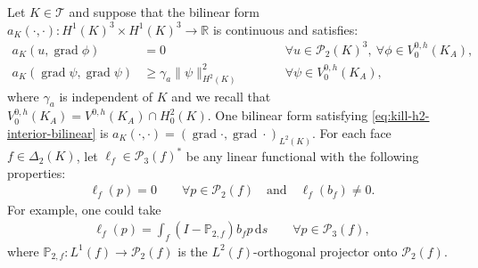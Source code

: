 \documentclass{mcom-l}
\theoremstyle{definition}
\theoremstyle{remark}
\numberwithin{equation}{section}
\renewcommand{\d}[1]{\,\mathrm{d}{#1}}
\DeclareMathOperator{\grad}{grad}
\newcommand{\mesh}[0]{\mathcal{T}}
\begin{document}
Let $K \in \mesh$ and suppose that the bilinear form
${a_K(\cdot,\cdot) : H^1(K)^3 \times H^1(K)^3 \to \mathbb{R}}$ 
is continuous and satisfies:
\begin{subequations}
	\label{eq:kill-h2-interior-bilinear}
	\begin{alignat}{2}
		\label{eq:kill-h2-interior-bilinear-kill-p2}
		a_K(u, \grad \phi) &= 0 
		\qquad & &\forall u \in \mathcal{P}_2(K)^3, 
		\ \forall \phi \in V^{0, h}_0(K_A), \\
		\label{eq:kill-h2-interior-bilinear-coercive}
		a_K(\grad \psi, \grad \psi) &\geq 
		\gamma_a \|\psi\|_{H^2(K)}^2 
		\qquad & &\forall \psi \in V^{0, h}_0(K_A),
	\end{alignat} 
\end{subequations}
where $\gamma_a$ is independent of $K$ and we recall 
that $V^{0, h}_0(K_A) = V^{0, h}(K_A) \cap H^2_0(K)$.
One bilinear form satisfying \cref{eq:kill-h2-interior-bilinear}
is $a_K(\cdot,\cdot) = (\grad \cdot, \grad \cdot)_{L^2(K)}$.
For each face $f \in \Delta_2(K)$, let 
$\ell_f \in \mathcal{P}_3(f)^*$ be any linear functional 
with the following properties:
\begin{align}
	\label{eq:kill-cubic-bubble-dof}
	\ell_f(p) = 0 \qquad \forall p \in \mathcal{P}_2(f)
	\quad \text{and} \quad \ell_f(b_f) \neq 0.
\end{align}
For example, one could take 
\begin{align*}
	\ell_f(p) = \int_f (I - \mathbb{P}_{2, f})b_f p \d{s} 
	\qquad \forall p \in \mathcal{P}_3(f),
\end{align*}
where $\mathbb{P}_{2, f} : L^1(f) \to \mathcal{P}_2(f)$
is the $L^2(f)$-orthogonal projector onto $\mathcal{P}_2(f)$.
\end{document}
